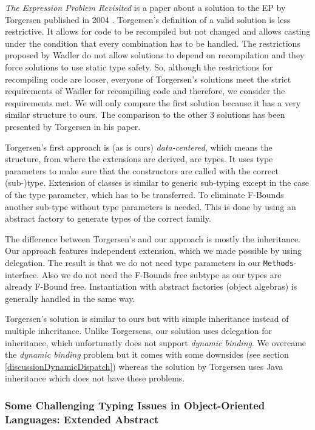 \documentclass{report}
\begin{document}
\emph{The Expression Problem Revisited} is a paper about a solution to the EP by Torgersen published in 2004 \cite{Torgersen-Expression-2004}.
Torgersen's definition of a valid solution is less restrictive. It allows for code to be recompiled but not changed and allows casting under the condition that every combination has to be handled. The restrictions proposed by Wadler \cite{Wadler-Expression-1998} do not allow solutions to depend on recompilation and they force solutions to use static type safety. So, although the restrictions for recompiling code are looser, everyone of Torgersen's solutions meet the strict requirements of Wadler for recompiling code and therefore, we consider the requirements met. We will only compare the first solution because it has a very similar structure to ours. The comparison to the other 3 solutions has been presented by Torgersen in his paper.

Torgersen's first approach is (as is ours) \emph{data-centered}, which means the structure, from where the extensions are derived, are types. It uses type parameters to make sure that the constructors are called with the correct (sub-)type. Extension of classes is similar to generic sub-typing except in the case of the type parameter, which has to be transferred. To eliminate F-Bounds another sub-type without type parameters is needed. This is done by using an abstract factory to generate types of the correct family.

The difference between Torgersen's and our approach is mostly the inheritance. Our approach features independent extension, which we made possible by using delegation. The result is that we do not need type parameters in our \lstinline{Methods}-interface. Also we do not need the F-Bounds free subtype as our types are already F-Bound free. Instantiation with abstract factories (object algebras) is generally handled in the same way.

Torgersen's solution is similar to ours but with simple inheritance instead of multiple inheritance.
Unlike Torgersens, our solution uses delegation for inheritance, which unfortunatly does not support \emph{dynamic binding}. We overcame the \emph{dynamic binding} problem but it comes with some downsides (see section \ref{discussionDynamicDispatch}) whereas the solution by Torgersen uses Java inheritance which does not have these problems.

\subsubsection*{Some Challenging Typing Issues in Object-Oriented Languages: Extended Abstract}
\end{document}
